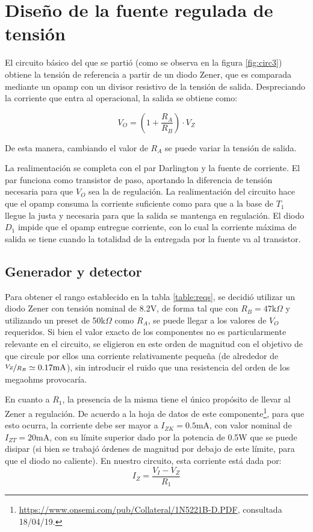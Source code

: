 \documentclass[e2_tp1_main.tex]{subfiles}
\begin{document}
\section{Dise\~no de la fuente regulada de tensi\'on}

El circuito b\'asico del que se parti\'o (como se observa en la figura \ref{fig:circ3}) obtiene la tensi\'on de referencia a partir de un diodo Zener, que es comparada mediante un opamp con un divisor resistivo de la tensi\'on de salida. Despreciando la corriente que entra al operacional, la salida se obtiene como:

\begin{equation}
	V_{O} = \left( 1+\frac{R_A}{R_B} \right) \cdot V_Z
\end{equation}

De esta manera, cambiando el valor de $R_A$ se puede variar la tensi\'on de salida. 

La realimentaci\'on se completa con el par Darlington y la fuente de corriente. El par funciona como transistor de paso, aportando la diferencia de tensi\'on necesaria para que $V_{O}$ sea la de regulaci\'on. La realimentaci\'on del circuito hace que el opamp consuma la corriente suficiente como para que a la base de $T_1$ llegue la justa y necesaria para que la salida se mantenga en regulaci\'on. El diodo $D_1$ impide que el opamp entregue corriente, con lo cual la corriente m\'axima de salida se tiene cuando la totalidad de la entregada por la fuente va al transistor.

\subsection{Generador y detector}

Para obtener el rango establecido en la tabla \ref{table:reqs}, se decidi\'o utilizar un diodo Zener con tensi\'on nominal de 8.2V, de forma tal que con $R_B=47\mathrm{k}\Omega$ y utilizando un preset de 50k$\Omega$ como $R_A$, se puede llegar a los valores de $V_O$ requeridos. Si bien el valor exacto de los componentes no es particularmente relevante en el circuito, se eligieron en este orden de magnitud con el objetivo de que circule por ellos una corriente relativamente peque\~na (de alrededor de $\nicefrac{V_Z}{R_B}\simeq 0.17\mathrm{mA}$), sin introducir el ruido que una resistencia del orden de los megaohms provocar\'ia.

En cuanto a $R_1$, la presencia de la misma tiene el \'unico prop\'osito de llevar al Zener a regulaci\'on. De acuerdo a la hoja de datos de este componente\footnote{
\url{https://www.onsemi.com/pub/Collateral/1N5221B-D.PDF}, consultada 18/04/19. 
}, para que esto ocurra, la corriente debe ser mayor a $I_{ZK}=0.5$mA, con valor nominal de $I_{ZT}=20$mA, con su l\'imite superior dado por la potencia de 0.5W que se puede disipar (si bien se trabaj\'o \'ordenes de magnitud por debajo de este l\'imite, para que el diodo no caliente). En nuestro circuito, esta corriente est\'a dada por:
\[I_Z= \frac{V_{I} - V_{Z}}{R_1} \]
\end{document}
